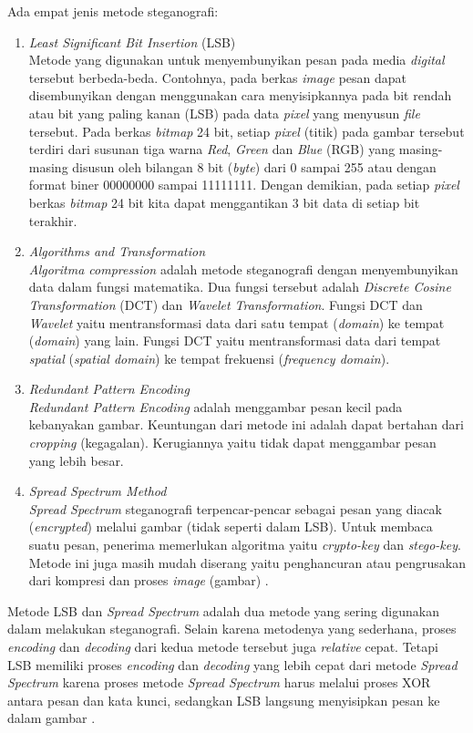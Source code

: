 	Ada empat jenis metode steganografi:
	\begin{enumerate}
		\item \emph{Least Significant Bit Insertion} (LSB)\\
		Metode yang digunakan untuk menyembunyikan pesan pada media \emph{digital} tersebut berbeda-beda. Contohnya, pada berkas \emph{image} pesan dapat disembunyikan dengan menggunakan cara menyisipkannya pada bit rendah atau bit yang paling kanan (LSB) pada data \emph{pixel} yang menyusun \emph{file} tersebut. Pada berkas \emph{bitmap} 24 bit, setiap \emph{pixel} (titik) pada gambar tersebut terdiri dari susunan tiga warna \emph{Red}, \emph{Green} dan \emph{Blue} (RGB) yang masing-masing disusun oleh bilangan 8 bit (\emph{byte}) dari 0 sampai 255 atau dengan format biner 00000000 sampai 11111111. Dengan demikian, pada setiap \emph{pixel} berkas \emph{bitmap} 24 bit kita dapat menggantikan 3 bit data di setiap bit terakhir. 
		\item \emph{Algorithms and Transformation}\\
		\emph{Algoritma compression} adalah metode steganografi dengan menyembunyikan data dalam fungsi matematika. Dua fungsi tersebut adalah \emph{Discrete Cosine Transformation} (DCT) dan \emph{Wavelet Transformation}. Fungsi DCT dan \emph{Wavelet} yaitu mentransformasi data dari satu tempat (\emph{domain}) ke tempat (\emph{domain}) yang lain. Fungsi DCT yaitu mentransformasi data dari tempat \emph{spatial} (\emph{spatial domain}) ke tempat frekuensi (\emph{frequency domain}).
		\item \emph{Redundant Pattern Encoding}\\
		\emph{Redundant Pattern Encoding} adalah menggambar pesan kecil pada kebanyakan gambar. Keuntungan dari metode ini adalah dapat bertahan dari \emph{cropping} (kegagalan). Kerugiannya yaitu tidak dapat menggambar pesan yang lebih besar.
		\item \emph{Spread Spectrum Method}\\
		\emph{Spread Spectrum} steganografi terpencar-pencar sebagai pesan yang diacak (\emph{encrypted}) melalui gambar (tidak seperti dalam LSB). Untuk membaca suatu pesan, penerima memerlukan algoritma yaitu \emph{crypto-key} dan \emph{stego-key}. Metode ini juga masih mudah diserang yaitu penghancuran atau pengrusakan dari kompresi dan proses \emph{image} (gambar) \cite{wikipedia1}.
	\end{enumerate}

	Metode LSB dan \emph{Spread Spectrum} adalah dua metode yang sering digunakan dalam melakukan steganografi. Selain karena metodenya yang sederhana, proses \emph{encoding} dan \emph{decoding} dari kedua metode tersebut juga \emph{relative} cepat\cite{pavani}. Tetapi LSB memiliki proses \emph{encoding} dan \emph{decoding} yang lebih cepat dari metode \emph{Spread Spectrum} karena proses metode \emph{Spread Spectrum} harus melalui proses XOR antara pesan dan kata kunci, sedangkan LSB langsung menyisipkan pesan ke dalam gambar \cite{pakereng}.
	
